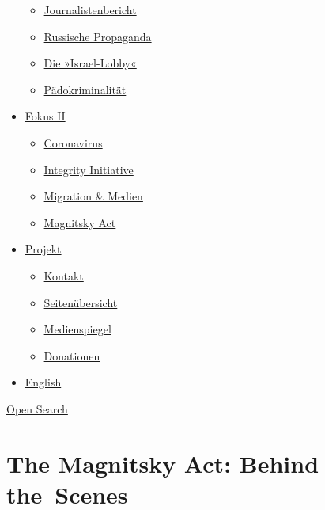 \begin{itemize}
  \begin{itemize}
  \tightlist
  \item
    \href{https://swprs.org/bericht-eines-journalisten/}{Journalistenbericht}
  \item
    \href{https://swprs.org/russische-propaganda/}{Russische Propaganda}
  \item
    \href{https://swprs.org/die-israel-lobby-fakten-und-mythen/}{Die
    »Israel-Lobby«}
  \item
    \href{https://swprs.org/geopolitik-und-paedokriminalitaet/}{Pädokriminalität}
  \end{itemize}
\item
  \href{https://swprs.org/migration-und-medien/}{Fokus II}

  \begin{itemize}
  \tightlist
  \item
    \href{https://swprs.org/covid-19-hinweis-ii/}{Coronavirus}
  \item
    \href{https://swprs.org/die-integrity-initiative/}{Integrity
    Initiative}
  \item
    \href{https://swprs.org/migration-und-medien/}{Migration \& Medien}
  \item
    \href{https://swprs.org/der-fall-magnitsky/}{Magnitsky Act}
  \end{itemize}
\item
  \href{https://swprs.org/kontakt/}{Projekt}

  \begin{itemize}
  \tightlist
  \item
    \href{https://swprs.org/kontakt/}{Kontakt}
  \item
    \href{https://swprs.org/uebersicht/}{Seitenübersicht}
  \item
    \href{https://swprs.org/medienspiegel/}{Medienspiegel}
  \item
    \href{https://swprs.org/donationen/}{Donationen}
  \end{itemize}
\item
  \href{https://swprs.org/contact/}{English}
\end{itemize}

\protect\hyperlink{}{Open Search}

\hypertarget{the-magnitsky-act-behind-the-scenes}{%
\section{The Magnitsky Act: Behind
the~Scenes}\label{the-magnitsky-act-behind-the-scenes}}


